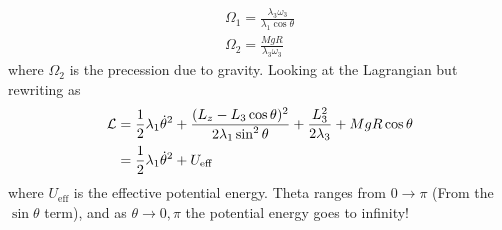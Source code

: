 \documentclass[../main.tex]{subfiles}
\begin{document}
\begin{align*}
    \Omega_1 = \frac{\lambda_3 \omega_3}{\lambda_1 \cos\theta} \\
    \Omega_2 = \frac{MgR}{\lambda_3 \omega_3} 
\end{align*}
where $\Omega_2$ is the precession due to gravity. Looking at the Lagrangian but rewriting as
\begin{align*}
    \mathcal{L} &= \frac{1}{2} \lambda_1 \dot\theta^2 + \frac{(L_z - L_3 \cos\theta)^2}{2\lambda_1 \sin^2\theta}
    + \frac{L_3^2}{2\lambda_3} + MgR \cos\theta \\
    &= \frac{1}{2} \lambda_1 \dot\theta^2 + U_{\text{eff}}
\end{align*}
where $U_{\text{eff}}$ is the effective potential energy. Theta ranges from $0 \to \pi$ 
(From the $\sin\theta$ term), and as $\theta \to 0, \pi$ the potential energy goes to infinity!
\end{document}

